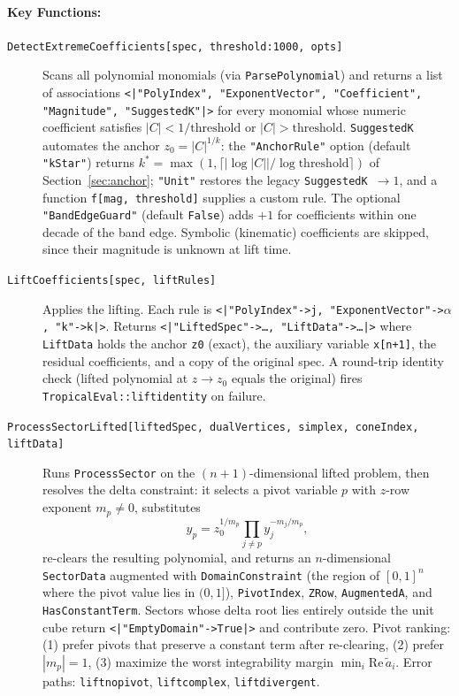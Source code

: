 \documentclass[11pt,a4paper]{article}
\begin{document}
\paragraph{Key Functions:}
\begin{description}
  \item[\texttt{DetectExtremeCoefficients[spec, threshold:1000, opts]}] Scans all polynomial monomials (via \texttt{ParsePolynomial}) and returns a list of associations \texttt{<|"PolyIndex", "ExponentVector", "Coefficient", "Magnitude", "SuggestedK"|>} for every monomial whose numeric coefficient satisfies $|C| < 1/\text{threshold}$ or $|C| > \text{threshold}$. \texttt{SuggestedK} automates the anchor $z_0 = |C|^{1/k}$: the \texttt{"AnchorRule"} option (default \texttt{"kStar"}) returns $k^{*} = \max(1,\lceil|\log|C||/\log\text{threshold}\rceil)$ of Section~\ref{sec:anchor}; \texttt{"Unit"} restores the legacy \texttt{SuggestedK}~$\to 1$, and a function \texttt{f[mag, threshold]} supplies a custom rule. The optional \texttt{"BandEdgeGuard"} (default \texttt{False}) adds $+1$ for coefficients within one decade of the band edge. Symbolic (kinematic) coefficients are skipped, since their magnitude is unknown at lift time.
  \item[\texttt{LiftCoefficients[spec, liftRules]}] Applies the lifting. Each rule is \texttt{<|"PolyIndex"->j, "ExponentVector"->$\alpha$, "k"->k|>}. Returns \texttt{<|"LiftedSpec"->\ldots, "LiftData"->\ldots|>} where \texttt{LiftData} holds the anchor \texttt{z0} (exact), the auxiliary variable \texttt{x[n+1]}, the residual coefficients, and a copy of the original spec. A round-trip identity check (lifted polynomial at $z \to z_0$ equals the original) fires \texttt{TropicalEval::liftidentity} on failure.
  \item[\texttt{ProcessSectorLifted[liftedSpec, dualVertices, simplex, coneIndex, liftData]}] Runs \texttt{ProcessSector} on the $(n{+}1)$-dimensional lifted problem, then resolves the delta constraint: it selects a pivot variable $p$ with $z$-row exponent $m_p \neq 0$, substitutes
  \begin{equation}
  y_p = z_0^{1/m_p} \prod_{j \neq p} y_j^{-m_j/m_p},
  \end{equation}
  re-clears the resulting polynomial, and returns an $n$-dimensional \texttt{SectorData} augmented with \texttt{DomainConstraint} (the region of $[0,1]^n$ where the pivot value lies in $(0,1]$), \texttt{PivotIndex}, \texttt{ZRow}, \texttt{AugmentedA}, and \texttt{HasConstantTerm}. Sectors whose delta root lies entirely outside the unit cube return \texttt{<|"EmptyDomain"->True|>} and contribute zero. Pivot ranking: (1) prefer pivots that preserve a constant term after re-clearing, (2) prefer $|m_p| = 1$, (3) maximize the worst integrability margin $\min_i \mathrm{Re}\,\tilde{a}_i$. Error paths: \texttt{liftnopivot}, \texttt{liftcomplex}, \texttt{liftdivergent}.

\end{description}
\end{document}
